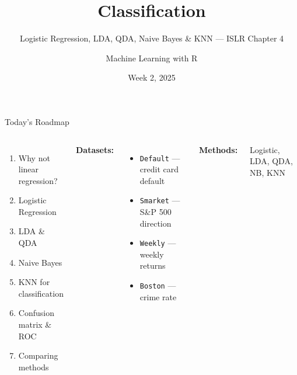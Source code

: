 \documentclass[aspectratio=169, 11pt]{beamer}
\title{Classification}
\subtitle{Logistic Regression, LDA, QDA, Naive Bayes \& KNN --- ISLR Chapter 4}
\author{Machine Learning with R}
\institute{Dr.\ Endri Ra\c{c}o}
\date{Week 2, 2025}
\begin{document}
\begin{frame}
\titlepage
\end{frame}

\begin{frame}{Today's Roadmap}
\begin{columns}
\begin{enumerate}
  \item Why not linear regression?
  \item Logistic Regression
  \item LDA \& QDA
  \item Naive Bayes
  \item KNN for classification
  \item Confusion matrix \& ROC
  \item Comparing methods
\end{enumerate}

\textbf{Datasets:}
\begin{itemize}
  \item \texttt{Default} --- credit card default
  \item \texttt{Smarket} --- S\&P 500 direction
  \item \texttt{Weekly} --- weekly returns
  \item \texttt{Boston} --- crime rate
\end{itemize}

\vspace{0.5em}
\textbf{Methods:}

Logistic, LDA, QDA, NB, KNN
\end{columns}
\end{frame}
\end{document}
